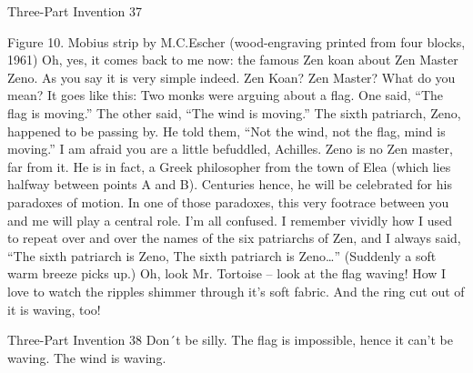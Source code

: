 Three-Part Invention                                                                            37

Figure 10. Mobius strip by M.C.Escher (wood-engraving printed from four blocks, 1961)
\achilles Oh, yes, it comes back to me now: the famous Zen koan about Zen
       Master Zeno. As you say it is very simple indeed.
\tortoise Zen Koan? Zen Master? What do you mean?
\achilles It goes like this: Two monks were arguing about a flag. One said, “The
       flag is moving.” The other said, “The wind is moving.” The sixth patriarch, Zeno,
       happened to be passing by. He told them, “Not the wind, not the flag, mind is
       moving.”
\tortoise I am afraid you are a little befuddled, Achilles. Zeno is no Zen master, far
       from it. He is in fact, a Greek philosopher from the town of Elea (which lies halfway
       between points A and B). Centuries hence, he will be celebrated for his paradoxes of
       motion. In one of those paradoxes, this very footrace between you and me will play a
       central role.
\achilles I’m all confused. I remember vividly how I used to repeat over and over
       the names of the six patriarchs of Zen, and I always said, “The sixth patriarch is Zeno,
       The sixth patriarch is Zeno…” (Suddenly a soft warm breeze picks up.) Oh, look Mr.
       Tortoise – look at the flag waving! How I love to watch the ripples shimmer through
       it’s soft fabric. And the ring cut out of it is waving, too!



Three-Part Invention                                                                          38
\tortoise Don´t be silly. The flag is impossible, hence it can’t be waving. The wind is
     waving.

